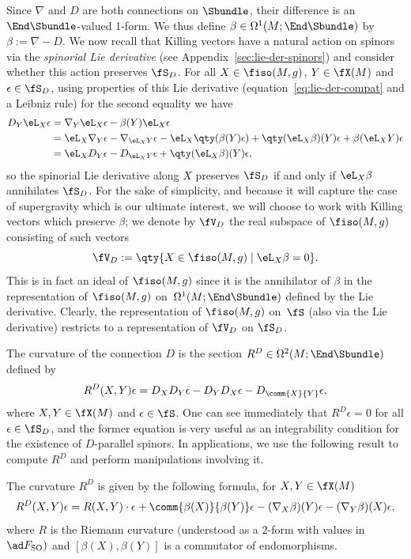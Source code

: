 Since $\nabla$ and $D$ are both connections on $\Sbundle$, their difference is an $\End\Sbundle$-valued 1-form. We thus define $\beta\in\Omega^1(M;\End\Sbundle)$ by $\beta := \nabla - D$. We now recall that Killing vectors have a natural action on spinors via the \emph{spinorial Lie derivative} (see Appendix~\ref{sec:lie-der-spinors}) and consider whether this action preserves $\fS_D$. For all $X\in\fiso(M,g)$, $Y\in\fX(M)$ and $\epsilon\in\fS_D$, using properties of this Lie derivative (equation~\eqref{eq:lie-der-compat} and a Leibniz rule) for the second equality we have
\begin{align*}
	D_Y\eL_X \epsilon
	&= \nabla_Y\eL_X\epsilon -\beta(Y)\eL_X\epsilon\\
&= \eL_X\nabla_Y\epsilon -\nabla_{\eL_X Y}\epsilon -\eL_X\qty(\beta(Y)\epsilon) +\qty(\eL_X\beta)(Y)\epsilon +\beta(\eL_XY)\epsilon\\
	&= \eL_X D_Y\epsilon - D_{\eL_X Y}\epsilon +\qty(\eL_X\beta)(Y)\epsilon,
\end{align*}
so the spinorial Lie derivative along $X$ preserves $\fS_D$ if and only if $\eL_X\beta$ annihilates $\fS_D$. For the sake of simplicity, and because it will capture the case of supergravity which is our ultimate interest, we will choose to work with Killing vectors which preserve $\beta$; we denote by $\fV_D$ the real subspace of $\fiso(M,g)$ consisting of such vectors
\[
\fV_D := \qty{X\in\fiso(M,g)\mid \eL_X \beta = 0}.
\]
This is in fact an ideal of $\fiso(M,g)$ since it is the annihilator of $\beta$ in the representation of $\fiso(M,g)$ on~$\Omega^1(M;\End\Sbundle)$ defined by the Lie derivative. Clearly, the representation of $\fiso(M,g)$ on~$\fS$ (also via the Lie derivative) restricts to a representation of $\fV_D$ on $\fS_D$.

The curvature of the connection $D$ is the section $R^D \in \Omega^2(M;\End\Sbundle)$ defined by
\begin{gather}\label{eq:D-curvature-def}
	R^D(X,Y)\epsilon = D_XD_Y\epsilon - D_YD_X\epsilon - D_{\comm{X}{Y}}\epsilon,
\end{gather}
where $X,Y\in\fX(M)$ and $\epsilon\in\fS$. One can see immediately that $R^D\epsilon=0$ for all $\epsilon\in\fS_D$, and the former equation is very useful as an integrability condition for the existence of $D$-parallel spinors. In applications, we use the following result to compute $R^D$ and perform manipulations involving it.

\begin{Proposition}\label{prop:D-curvature}
	The curvature $R^D$ is given by the following formula, for $X,Y\in\fX(M)$
	\begin{equation}\label{eq:D-curvature-formula}
		R^D(X,Y)\epsilon = R(X,Y)\cdot\epsilon + \comm{\beta(X)}{\beta(Y)}\epsilon - (\nabla_X\beta)(Y)\epsilon - (\nabla_Y\beta)(X)\epsilon,
	\end{equation}
	where $R$ is the Riemann curvature $($understood as a $2$-form with values in $\ad F_{\rm SO})$ and $[\beta(X),\allowbreak\beta(Y)]$ is a commutator of endomorphisms.
\end{Proposition}

